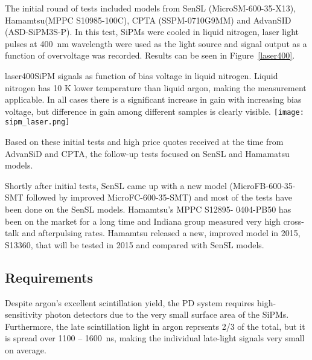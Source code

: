 The initial round of
tests included models from SenSL (MicroSM-600-35-X13), Hamamtsu(MPPC
S10985-100C), CPTA (SSPM-0710G9MM) and AdvanSID (ASD-SiPM3S-P).
In
this test, SiPMs were cooled in liquid nitrogen, laser light pulses at 400~nm
wavelength were used as the light source and signal output as a
function of overvoltage was recorded. Results can be seen in Figure~\ref{laser400}.

\begin{cdrfigure}{laser400}{SiPM signals as function of bias voltage in
    liquid nitrogen. Liquid nitrogen has 10 K lower temperature than
    liquid argon, making the measurement applicable. In all cases
    there is a significant increase in gain with increasing bias
    voltage, but difference in gain among different samples is clearly
    visible.} 
  \texttt{[image: sipm\_laser.png]}
\end{cdrfigure}

Based on these initial tests and high price
quotes received at the time from AdvanSiD and CPTA, the follow-up tests focused on SenSL and
Hamamatsu models.  %

Shortly after initial tests, SenSL came up with a new model
(MicroFB-600-35-SMT followed by improved MicroFC-600-35-SMT) and most
of the tests  have been done on the SenSL models. Hamamtsu’s MPPC
S12895- 0404-PB50 has been on the market for a long time and Indiana
group measured very high cross-talk and afterpulsing rates.  Hamamtsu
released a new, improved model in 2015, S13360, that will be
tested in 2015 and compared with SenSL models.


\subsection{Requirements}

Despite argon's excellent scintillation yield, the PD system requires high-sensitivity photon detectors %
due to
the very small surface area of the SiPMs. %
Furthermore, the late scintillation light in
argon reprsents 2/3 of the total, %
but it is spread
over 1100 -- 1600~ns, making the individual late-light signals very
small on average.

